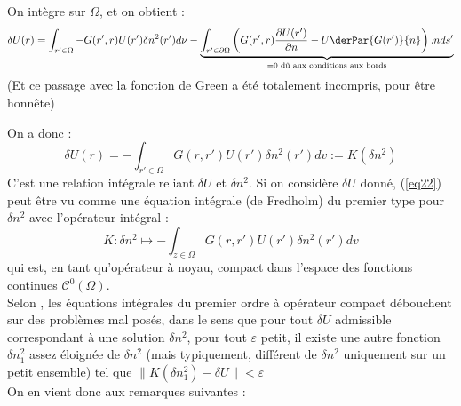 \documentclass{article}
\begin{document}
On intègre sur $\Omega$, et on obtient :
\[\delta U(r)=\int_{r'\in\Omega} -G(r',r)U(r')\delta n^2(r')d\nu - \underbrace{\int_{r'\in\partial\Omega} \left( G(r',r)\frac{\partial U(r')}{\partial n} -U\derPar{G(r')}{n}\right).n ds'}_{=0 \text{ dû aux conditions aux bords}}\]
(Et ce passage avec la fonction de Green a été totalement incompris, pour être honnête)

\bigskip
On a donc :
\begin{equation}\label{eq22}
	\delta U(r)=-\int_{r'\in\Omega} G(r,r')U(r')\delta n^2(r')dv := K(\delta n^2)
\end{equation}
C'est une relation intégrale reliant $\delta U$ et $\delta n^2$. Si on considère $\delta U$ donné, (\ref{eq22}) peut être vu comme une équation intégrale (de Fredholm) du premier type pour $\delta n^2$ avec l'opérateur intégral :
\[K : \delta n^2 \mapsto -\int_{z\in\Omega} G(r,r')U(r')\delta n^2(r') dv\]
qui est, en tant qu'opérateur à noyau, compact dans l'espace des fonctions continues $\mathscr{C}^0(\Omega)$. \\
Selon \cite{engl96regu}, les équations intégrales du premier ordre à opérateur compact débouchent sur des problèmes mal posés, dans le sens que pour tout $\delta U$ admissible correspondant à une solution $\delta n^2$, pour tout $\varepsilon$ petit, il existe une autre fonction $\delta n_1^2$ assez éloignée de $\delta n^2$ (mais typiquement, différent de $\delta n^2$ uniquement sur un petit ensemble) tel que $\|K(\delta n_1^2)-\delta U\|<\varepsilon$\\
On en vient donc aux remarques suivantes :
\end{document}

